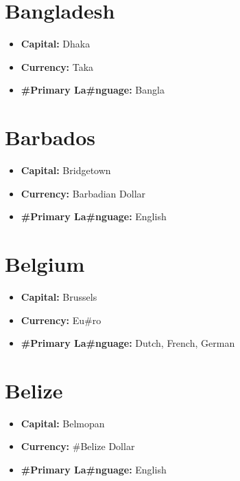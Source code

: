 \documentclass[a4paper,twoside]{book}
\begin{document}
\section*{\Huge Bangladesh}
\vspace{5mm} %
\begin{itemize}
	\item \textbf{Capital:} Dhaka
	\item \textbf{Currency:} Taka
	\item \textbf{\#Primary La\#nguage:} Bangla
\end{itemize}

\section*{\Huge Barbados}
\vspace{5mm} %
\begin{itemize}
	\item \textbf{Capital:} Bridgetown
	\item \textbf{Currency:} Barbadian Dollar
	\item \textbf{\#Primary La\#nguage:} English
\end{itemize}

\section*{\Huge Belgium}
\vspace{5mm} %
\begin{itemize}
	\item \textbf{Capital:} Brussels
	\item \textbf{Currency:} Eu\#ro
	\item \textbf{\#Primary La\#nguage:} Dutch, French, German
\end{itemize}

\section*{\Huge Belize}
\vspace{5mm} %
\begin{itemize}
	\item \textbf{Capital:} Belmopan
	\item \textbf{Currency:} \#Belize Dollar
	\item \textbf{\#Primary La\#nguage:} English
\end{itemize}
\end{document}
